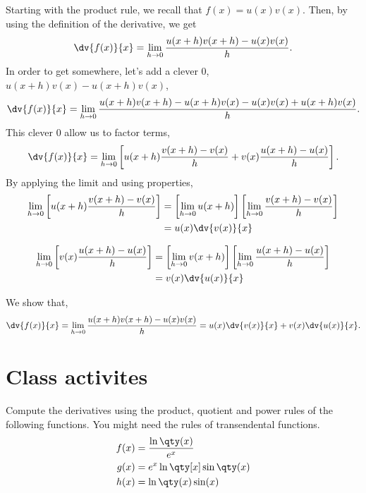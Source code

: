 \documentclass[../main-notes.tex]{subfile}
\begin{document}
Starting with the product rule, we recall that \(f(x) = u(x)v(x)\).
Then, by using the definition of the derivative, we get 
\begin{gather*}
    \dv{f(x)}{x} = \lim_{h\to0}\frac{u(x+h)v(x+h) - u(x)v(x)}{h}.
\end{gather*}
In order to get somewhere, let's add a clever \num{0}, $u(x+h)v(x)-u(x+h)v(x)$,
\begin{gather*}
    \dv{f(x)}{x} = \lim_{h\to0}\frac{u(x+h)v(x+h) - u(x+h)v(x) - u(x)v(x) + u(x+h)v(x)}{h}.
\end{gather*}
This clever \num{0} allow us to factor terms,
\begin{gather*}
    \dv{f(x)}{x} = \lim_{h\to0}\left[u(x+h)\frac{v(x+h) - v(x)}{h} + v(x)\frac{u(x+h) - u(x)}{h} \right].
\end{gather*}
By applying the limit and using properties,
\begin{align*}
    \lim_{h\to0}\left[u(x+h)\frac{v(x+h) - v(x)}{h}\right] &=\left[\lim_{h\to0}u(x+h)\right]\left[\lim_{h\to0}\frac{v(x+h) - v(x)}{h}\right] \\
                                                           &= u(x)\dv{v(x)}{x} 
\end{align*}

\begin{align*}
    \lim_{h\to0}\left[v(x)\frac{u(x+h) - u(x)}{h}\right] &=\left[\lim_{h\to0}v(x+h)\right]\left[\lim_{h\to0}\frac{u(x+h) - u(x)}{h}\right] \\
                                                           &= v(x)\dv{u(x)}{x} 
\end{align*}

We show that,
\begin{gather*}
    \dv{f(x)}{x} = \lim_{h\to0}\frac{u(x+h)v(x+h) - u(x)v(x)}{h} = u(x)\dv{v(x)}{x} + v(x)\dv{u(x)}{x}.
\end{gather*}

\section{Class activites}

Compute the derivatives using the product, quotient and power rules of the following functions.
You might need the rules of transendental functions.
\begin{align*}
    f(x) &= \frac{\ln\qty(x)}{e^{x}} \\
    g(x) &= e^{x}\ln\qty[x]\sin\qty(x) \\
    h(x) &= \ln\qty(x)\sin(x)
\end{align*}
\end{document}
